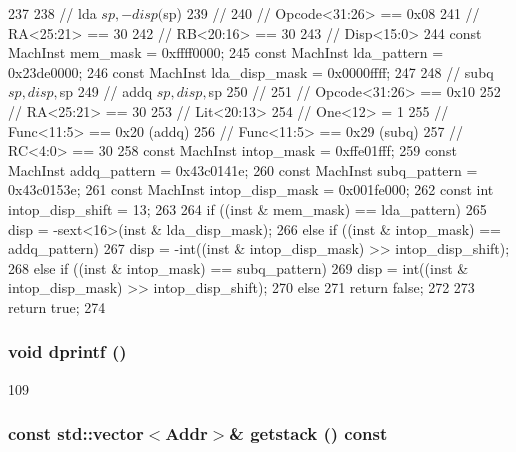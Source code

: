 \begin{DoxyCode}
237 {
238     // lda $sp, -disp($sp)
239     //
240     // Opcode<31:26> == 0x08
241     // RA<25:21> == 30
242     // RB<20:16> == 30
243     // Disp<15:0>
244     const MachInst mem_mask = 0xffff0000;
245     const MachInst lda_pattern = 0x23de0000;
246     const MachInst lda_disp_mask = 0x0000ffff;
247 
248     // subq $sp, disp, $sp
249     // addq $sp, disp, $sp
250     //
251     // Opcode<31:26> == 0x10
252     // RA<25:21> == 30
253     // Lit<20:13>
254     // One<12> = 1
255     // Func<11:5> == 0x20 (addq)
256     // Func<11:5> == 0x29 (subq)
257     // RC<4:0> == 30
258     const MachInst intop_mask = 0xffe01fff;
259     const MachInst addq_pattern = 0x43c0141e;
260     const MachInst subq_pattern = 0x43c0153e;
261     const MachInst intop_disp_mask = 0x001fe000;
262     const int intop_disp_shift = 13;
263 
264     if ((inst & mem_mask) == lda_pattern)
265         disp = -sext<16>(inst & lda_disp_mask);
266     else if ((inst & intop_mask) == addq_pattern)
267         disp = -int((inst & intop_disp_mask) >> intop_disp_shift);
268     else if ((inst & intop_mask) == subq_pattern)
269         disp = int((inst & intop_disp_mask) >> intop_disp_shift);
270     else
271         return false;
272 
273     return true;
274 }
\end{DoxyCode}
\hypertarget{classAlphaISA_1_1StackTrace_a70fdc8802b54b4244889a2d3553405d5}{
\subsubsection[{dprintf}]{\setlength{\rightskip}{0pt plus 5cm}void dprintf ()}}
\label{classAlphaISA_1_1StackTrace_a70fdc8802b54b4244889a2d3553405d5}



\begin{DoxyCode}
109 {}
\end{DoxyCode}
\hypertarget{classAlphaISA_1_1StackTrace_aceb93ba31a3756aca859b4643efeeb46}{
\subsubsection[{getstack}]{\setlength{\rightskip}{0pt plus 5cm}const {\bf std::vector}$<${\bf Addr}$>$\& getstack () const}}
\label{classAlphaISA_1_1StackTrace_aceb93ba31a3756aca859b4643efeeb46}



